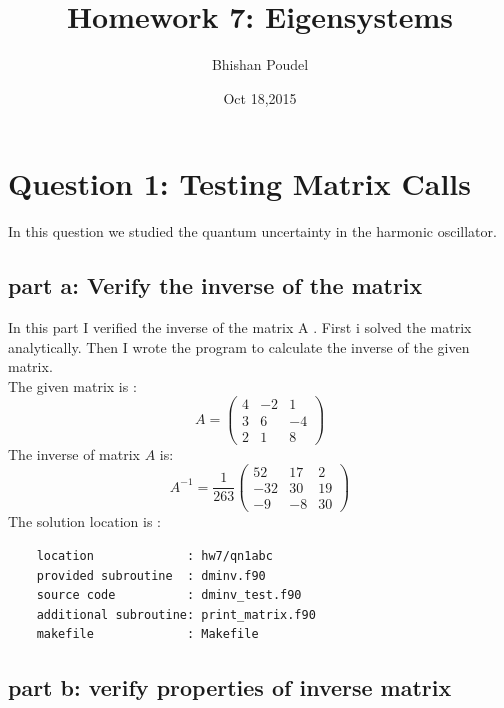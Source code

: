 \documentclass[11pt,a4paper,english]{article}
\title{Homework 7: Eigensystems}
\author{Bhishan Poudel}
\date{Oct 18,2015}
\newcommand{\bdm}{\begin{displaymath}}
\newcommand{\edm}{\end{displaymath}}
\begin{document}
\maketitle
\tableofcontents
\listoffigures
\clearpage


\section{Question 1: Testing Matrix Calls}
In this question we studied the quantum uncertainty in the harmonic oscillator.\\

	
	\subsection{part a: Verify the inverse of the matrix}
	
	In this part I verified the inverse of the matrix A .
	First i solved the matrix analytically.
	Then I wrote the program to calculate the inverse of the given matrix.\\
	The given matrix is :\\
    \begin{displaymath}
      A=
  		\begin{pmatrix}
    			4 & -2 & 1 \\
    			3 &  6 & -4 \\
    			2 &  1 &  8 
  		\end{pmatrix}
	\end{displaymath}
	The inverse of matrix $A$ is:\\
	\bdm
	 A^{-1} = \frac{1}{263} 	      
  		\begin{pmatrix}
    			52 & 17 & 2 \\
    		   -32 & 30 & 19 \\
    		   -9  & -8 & 30 
  		\end{pmatrix}
	\edm
	The solution location is :\\
	\begin{verbatim}
	location             : hw7/qn1abc
	provided subroutine  : dminv.f90
	source code          : dminv_test.f90
	additional subroutine: print_matrix.f90
	makefile             : Makefile
	\end{verbatim}
	
	\subsection{part b: verify properties of inverse matrix}
	
\end{document}
